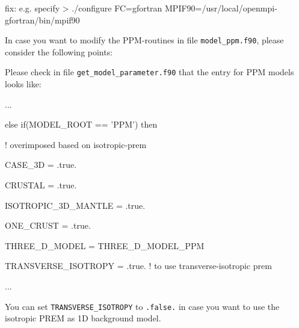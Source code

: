 \documentclass[oneside,english]{book}
\newenvironment{lyxcode}
{\begin{list}{}{
\setlength{\rightmargin}{\leftmargin}
\setlength{\listparindent}{0pt}%
\raggedright
\setlength{\itemsep}{0pt}
\setlength{\parsep}{0pt}
\normalfont\ttfamily}%
 \item[]}
{\end{list}}
\begin{document}
\begin{description}
  fix: e.g. specify > ./configure FC=gfortran MPIF90=/usr/local/openmpi-gfortran/bin/mpif90


\item [changing PPM model routines fails:]
  In case you want to modify the PPM-routines in file \texttt{model\_ppm.f90}, please consider the following points:

  \begin{enumerate}
  \item Please check in file \texttt{get\_model\_parameter.f90} that the entry for PPM models looks like:
  \begin{lyxcode}
{\footnotesize  ... }{\footnotesize \par}
{\footnotesize  else if(MODEL\_ROOT == 'PPM') then  }{\footnotesize \par}
{\footnotesize   ! overimposed based on isotropic-prem  }{\footnotesize \par}
{\footnotesize   CASE\_3D = .true.  }{\footnotesize \par}
{\footnotesize   CRUSTAL = .true.  }{\footnotesize \par}
{\footnotesize   ISOTROPIC\_3D\_MANTLE = .true.  }{\footnotesize \par}
{\footnotesize   ONE\_CRUST = .true.  }{\footnotesize \par}
{\footnotesize   THREE\_D\_MODEL = THREE\_D\_MODEL\_PPM  }{\footnotesize \par}
{\footnotesize   TRANSVERSE\_ISOTROPY = .true. ! to use transverse-isotropic prem  }{\footnotesize \par}
{\footnotesize  ...  }{\footnotesize \par}
  \end{lyxcode}
  You can set \texttt{TRANSVERSE\_ISOTROPY} to \texttt{.false.} in case you want to use the isotropic PREM
  as 1D background model.


\end{enumerate}
\end{description}
\end{document}
